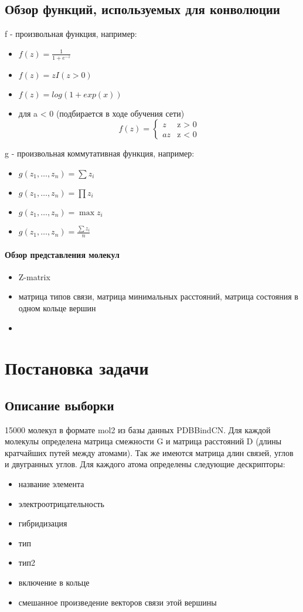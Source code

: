 \documentclass[12pt,twoside]{article}
\begin{document}
\subsection{Обзор функций, используемых для конволюции}
f - произвольная функция, например:
\begin{itemize}
\item $f(z) = \frac{1}{1+e^{-z}}$
\item $f(z) = z I(z > 0)$
\item $f(z) = log(1+exp(x))$
\item для a < 0 (подбирается в ходе обучения сети) 
	\begin{equation*}
	f(z) = 
	 \begin{cases}
		 z &\text{z > 0}\\
		 az &\text{z < 0}
	 \end{cases}
	\end{equation*}
\end{itemize}
g - произвольная коммутативная функция, например:
\begin{itemize}
\item $g(z_1,\dots, z_n) = \sum{z_i}$
\item $g(z_1,\dots, z_n) = \prod{z_i}$
\item $g(z_1,\dots, z_n) = \max{z_i}$
\item $g(z_1,\dots, z_n) = \frac{\sum{z_i}}{n}$
\end{itemize}
\paragraph{Обзор представления молекул}
\begin{itemize}
\item Z-matrix
\item матрица типов связи, матрица минимальных расстояний, матрица состояния в одном кольце вершин
\item 
\end{itemize}

\section{Постановка задачи}
\subsection{Описание выборки}
15000 молекул в формате mol2 из базы данных PDBBindCN. Для каждой молекулы определена матрица смежности G и матрица расстояний D (длины кратчайших путей между атомами). Так же имеются матрица длин связей, углов и двугранных углов. Для каждого атома определены следующие дескрипторы:
\begin{itemize}
\item название элемента
\item электроотрицательность
\item гибридизация
\item тип
\item тип2
\item включение в кольце
\item смешанное произведение векторов связи этой вершины
\end{itemize}
\end{document}

